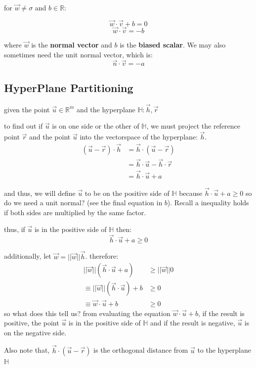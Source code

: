 \documentclass[12pt]{book}
\begin{document}
for $\vec w\neq \sigma$ and $b\in \mathbb{R}$:

\[\vec w \cdot \vec v + b = 0\]
\[\vec w \cdot \vec v = -b\]

where $\vec w$ is the \textbf{normal vector} and $b$ is the \textbf{biased scalar}.
We may also sometimes need the unit normal vector, which is:
\[\vec n \cdot \vec v = -a\]

\subsection*{HyperPlane Partitioning}
given the point $\vec u \in \mathbb{R}^m$ and the hyperplane $\mathbb{H}: \vec h, \vec r$

to find out if $\vec u$ is on one side or the other of $\mathbb{H}$, we must project the reference point $\vec r$ and the point $\vec u$ into the 
vectorspace of the hyperplane: $\vec h$.
\begin{align*}
        (\vec u - \vec r) \cdot \vec h &= \vec h \cdot (\vec u - \vec r)\\
                                       &=\vec h \cdot \vec u - \vec h \cdot \vec r\\
                                       &=\vec h \cdot \vec u + a
\end{align*}

and thus, we will define $\vec u$ to be on the positive side of $\mathbb{H}$ because $\vec h \cdot \vec u + a \geq 0$
so do we need a unit normal? (see the final equation in $b$). Recall a inequality holds if both sides are multiplied by the same factor.

thus, if $\vec u$ is in the positive side of $\mathbb{H}$ then:
\[\vec h \cdot \vec u + a \geq 0\]

additionally, let $\vec w = ||\vec w||\vec h$. therefore:
\begin{align*}
        ||\vec w||(\vec h \cdot \vec u + a) &\geq ||\vec w||0\\
        \equiv ||\vec w||(\vec h \cdot \vec u) + b &\geq 0\\
        \equiv \vec w \cdot \vec u + b &\geq 0
\end{align*}
so what does this tell us? from evaluating the equation 
$\vec w \cdot \vec u + b$, if the result is positive, the point 
$\vec u$ is in the positive side of $\mathbb{H}$ and if the 
result is negative, $\vec u$ is on the negative side.

Also note that, $\vec h \cdot (\vec u - \vec r)$ is the orthogonal 
distance from $\vec u$ to the hyperplane $\mathbb{H}$
\end{document}

